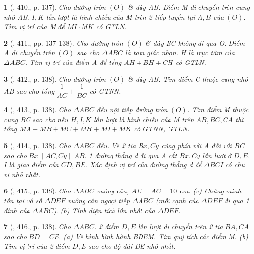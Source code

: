 \documentclass{article}
\newtheorem{baitoan}{}
\begin{document}
\begin{baitoan}[\cite{Binh_Toan_9_tap_2}, 410., p. 137]
	Cho đường tròn $(O)$ \& dây AB. Điểm M di chuyển trên cung nhỏ AB. $I,K$ lần lượt là hình chiếu của M trên 2 tiếp tuyến tại $A,B$ của $(O)$. Tìm vị trí của M để $MI\cdot MK$ có {\rm GTLN}.
\end{baitoan}

\begin{baitoan}[\cite{Binh_Toan_9_tap_2}, 411., pp. 137--138]
	Cho đường tròn $(O)$ \& dây BC không đi qua O. Điểm A di chuyển trên $(O)$ sao cho $\Delta ABC$ là tam giác nhọn. H là trực tâm của $\Delta ABC$. Tìm vị trí của điểm A để tổng $AH + BH + CH$ có {\rm GTLN}.
\end{baitoan}

\begin{baitoan}[\cite{Binh_Toan_9_tap_2}, 412., p. 138]
	Cho đường tròn $(O)$ \& dây AB. Tìm điểm C thuộc cung nhỏ AB sao cho tổng $\dfrac{1}{AC} + \dfrac{1}{BC}$ có {\rm GTNN}.
\end{baitoan}

\begin{baitoan}[\cite{Binh_Toan_9_tap_2}, 413., p. 138]
	Cho $\Delta ABC$ đều nội tiếp đường tròn $(O)$. Tìm điểm M thuộc cung BC sao cho nếu $H,I,K$ lần lượt là hình chiếu của M trên $AB,BC,CA$ thì tổng $MA + MB + MC + MH + MI + MK$ có {\rm GTNN, GTLN}.
\end{baitoan}

\begin{baitoan}[\cite{Binh_Toan_9_tap_2}, 414., p. 138]
	Cho $\Delta ABC$ đều. Vẽ 2 tia $Bx,Cy$ cùng phía với A đối với BC sao cho $Bx\parallel AC,Cy\parallel AB$. 1 đường thẳng d đi qua A cắt $Bx,Cy$ lần lượt ở $D,E$. I là giao điểm của $CD,BE$. Xác định vị trí của đường thẳng d để $\Delta BCI$ có chu vi nhỏ nhất.
\end{baitoan}

\begin{baitoan}[\cite{Binh_Toan_9_tap_2}, 415., p. 138]
	Cho $\Delta ABC$ vuông cân, $AB = AC = 10$ {\rm cm}. (a) Chứng minh tồn tại vô số $\Delta DEF$ vuông cân ngoại tiếp $\Delta ABC$ (mỗi cạnh của $\Delta DEF$ đi qua 1 đỉnh của $\Delta ABC$). (b) Tính diện tích lớn nhất của $\Delta DEF$.
\end{baitoan}

\begin{baitoan}[\cite{Binh_Toan_9_tap_2}, 416., p. 138]
	Cho $\Delta ABC$. 2 điểm $D,E$ lần lượt di chuyển trên 2 tia $BA,CA$ sao cho $BD = CE$. (a) Vẽ hình bình hành BDEM. Tìm quỹ tích các điểm M. (b) Tìm vị trí của 2 điểm $D,E$ sao cho độ dài DE nhỏ nhất.
\end{baitoan}
\end{document}
